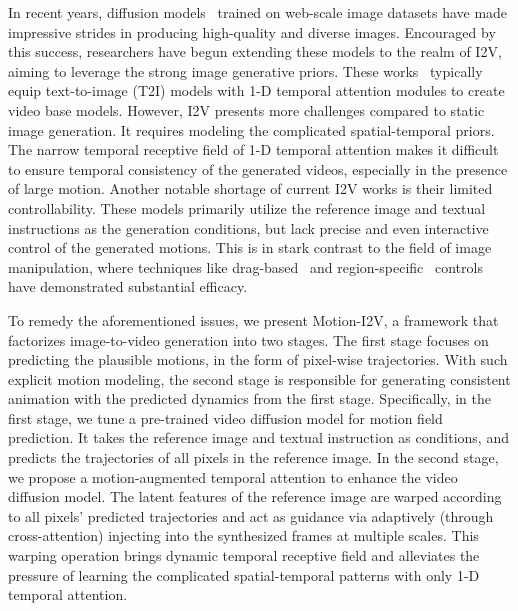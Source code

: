 \documentclass[10pt,twocolumn,letterpaper]{article}
\begin{document}
In recent years, diffusion models~\cite{rombach2021highresolution,Imagen,glide} trained on web-scale image datasets have made impressive strides in producing high-quality and diverse images. Encouraged by this success, researchers have begun extending these models to the realm of I2V, aiming to leverage the strong image generative priors. These works~\cite{zhang2023pia,dai2023finegrained,xing2023dynamicrafter,2023videocomposer,2023i2vgenxl} typically equip text-to-image (T2I) models with 1-D temporal attention modules to create video base models. However, I2V presents more challenges compared to static image generation. It requires modeling the complicated spatial-temporal priors. The narrow temporal receptive field of 1-D temporal attention makes it difficult to ensure temporal consistency of the generated videos, especially in the presence of large motion. Another notable shortage of current I2V works is their limited controllability. These models primarily utilize the reference image and textual instructions as the generation conditions, but lack precise and even interactive control of the generated motions. This is in stark contrast to the field of image manipulation, where techniques like drag-based~\cite{shi2023dragdiffusion,mou2023dragondiffusion,10.1145/3588432.3591500} and region-specific~\cite{huang2023region,where2edit} controls have demonstrated substantial efficacy.

To remedy the aforementioned issues, we present Motion-I2V, a framework that factorizes image-to-video generation into two stages. The first stage focuses on predicting the plausible motions, in the form of pixel-wise trajectories. With such explicit motion modeling, the second stage is responsible for generating consistent animation with the predicted dynamics from the first stage. Specifically, in the first stage, we tune a pre-trained video diffusion model for motion field prediction. It takes the reference image and textual instruction as conditions, and predicts the trajectories of all pixels in the reference image. In the second stage, we propose a motion-augmented temporal attention to enhance the video diffusion model. The latent features of the reference image are warped according to all pixels' predicted trajectories and act as guidance via adaptively (through cross-attention) injecting into the synthesized frames at multiple scales. This warping operation brings dynamic temporal receptive field and alleviates the pressure of learning the complicated spatial-temporal patterns with only 1-D temporal attention.
\end{document}
